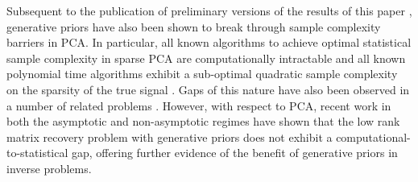 \documentclass[11pt]{article}
\theoremstyle{remark}
\begin{document}


Subsequent to the publication of preliminary versions of the results of this paper \cite{HLV18}, generative priors have also been shown to break through sample complexity barriers in PCA. In particular, all known algorithms to achieve optimal statistical sample complexity in sparse PCA are computationally intractable and all known polynomial time algorithms exhibit a sub-optimal quadratic sample complexity on the sparsity of the true signal \cite{Krauthgameretal15,DeshpandeMontanari14}. Gaps of this nature have also been observed in a number of related problems \cite{Decelleetal11,RichardMontanari14}. However, with respect to PCA, recent work in both the asymptotic \cite{SpikedGenPrior19} and non-asymptotic regimes \cite{CHV20} have shown that the low rank matrix recovery problem with generative priors does not exhibit a computational-to-statistical gap, offering further evidence of the benefit of generative priors in inverse problems. 



\end{document}
